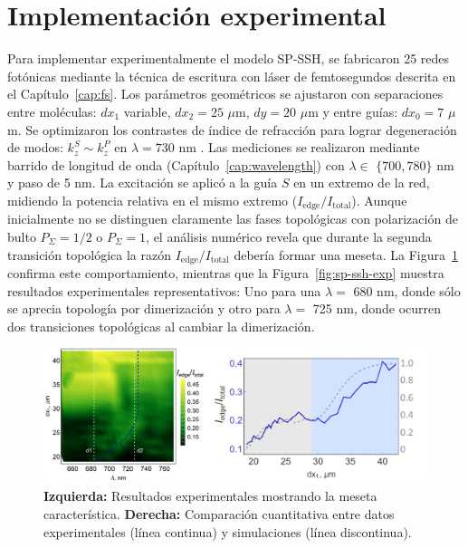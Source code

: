 \section{Implementación experimental}
Para implementar experimentalmente el modelo SP-SSH, se fabricaron 25 redes fotónicas mediante la técnica de escritura con láser de femtosegundos descrita en el Capítulo~\ref{cap:fs}. Los parámetros geométricos se ajustaron con separaciones entre moléculas: $dx_1$ variable, $dx_2 = 25$ $\mu$m, $dy = 20$ $\mu$m y entre guías: $dx_0 = 7$ $\mu$m. Se optimizaron los contrastes de índice de refracción para lograr degeneración de modos: $k_z^S \sim k_z^P$ en $\lambda = 730$ nm \cite{interorbital}. Las mediciones se realizaron mediante barrido de longitud de onda (Capítulo~\ref{cap:wavelength}) con $\lambda \in$ $\{700, 780\}$ nm y paso de 5 nm. La excitación se aplicó a la guía $S$ en un extremo de la red, midiendo la potencia relativa en el mismo extremo ($I_{\text{edge}}/I_{\text{total}}$). Aunque inicialmente no se distinguen claramente las fases topológicas con polarización de bulto $P_\Sigma=1/2$ o $P_\Sigma=1$, el análisis numérico revela que durante la segunda transición topológica la razón $I_{\text{edge}}/I_{\text{total}}$ debería formar una meseta. La Figura~\ref{fig:sp-ssh-num} confirma este comportamiento, mientras que la Figura~\ref{fig:sp-ssh-exp} muestra resultados experimentales representativos: Uno para una $\lambda =$ 680 nm, donde sólo se aprecia topología por dimerización y otro para $\lambda =$ 725 nm, donde ocurren dos transiciones topológicas al cambiar la dimerización.

\begin{figure}[H]
	\centering
	\includegraphics[width=0.8\linewidth]{media/sp-ssh-exp-num.png}
	\caption[Análisis numérico-experimental del modelo SP-SSH]{
		\textbf{Izquierda:} Resultados experimentales mostrando la meseta característica. 
		\textbf{Derecha:} Comparación cuantitativa entre datos experimentales (línea continua) y simulaciones (línea discontinua).
		\label{fig:sp-ssh-num}}
\end{figure}

